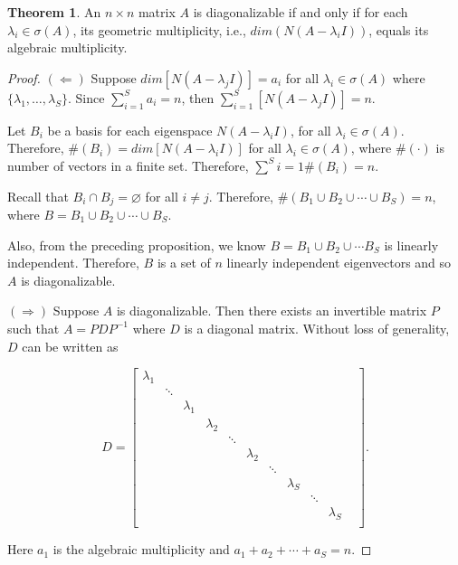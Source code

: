 \documentclass[12pt]{article}
\theoremstyle{definition}
\newtheorem{theorem}{Theorem}[section]  %
\begin{document}
\begin{theorem}
An $n \times n$ matrix $A$ is diagonalizable if and only if for each $\lambda_i \in \sigma(A)$, its
geometric multiplicity, i.e., $dim(N(A - \lambda_i I))$, equals its algebraic multiplicity.
\end{theorem}

\begin{proof}
$(\Leftarrow)$ Suppose $dim[N(A - \lambda_j I)] = a_i$ for all $\lambda_i \in \sigma(A)$
where $\{ \lambda_1, \ldots, \lambda_S\}$. Since $\displaystyle \sum_{i=1}^{S} a_i = n$,
then $\displaystyle \sum_{i = 1}^{S} [N(A - \lambda_j I)] = n$.

Let $B_i$ be a basis for each eigenspace $N(A - \lambda_i I)$, for all 
$\lambda_i \in \sigma(A)$. Therefore, $\# (B_i) = dim [N(A - \lambda_i I)]$ for all
$\lambda_i \in \sigma(A)$, where $\#(\cdot)$ is number of vectors in a finite set. Therefore,
$\displaystyle \sum^{S}{i = 1} \#(B_i) = n$.

Recall that $B_i \cap B_j = \varnothing$ for all $i \neq j$. Therefore,
$\#(B_1 \cup B_2 \cup \cdots \cup B_S) = n$, where $B = B_1 \cup B_2 \cup \cdots \cup B_S$.

Also, from the preceding proposition, we know $B = B_1 \cup B_2 \cup \cdots B_S$ is 
linearly independent. Therefore, $B$ is a set of $n$ linearly independent eigenvectors
and so $A$ is diagonalizable.

$(\Rightarrow)$ Suppose $A$ is diagonalizable. Then there exists an invertible matrix
$P$ such that $A = PDP^{-1}$ where $D$ is a diagonal matrix. Without loss of generality,
$D$ can be written as

\[
D =
\begin{bmatrix}
\lambda_1 & & & & & & & & & & \\
& \ddots & & & & & & & & & \\
& & \lambda_1 & & & & & & & & \\
& & & \lambda_2 & & & & & & & \\
& & & & \ddots & & & & & \\
& & & & & \lambda_2 & & & & & \\
& & & & & & \ddots & & & & \\
& & & & & & & \lambda_S & & & \\
& & & & & & & & \ddots & & \\
& & & & & & & & & \lambda_S & \\
\end{bmatrix}.
\]

Here $a_1$ is the algebraic multiplicity and $a_1 + a_2 + \cdots + a_S = n$.


\end{proof}
\end{document}
